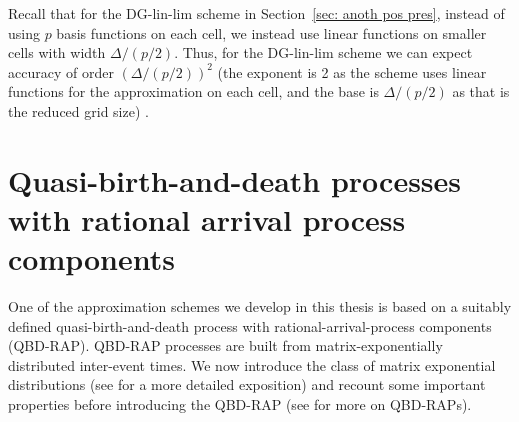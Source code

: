 Recall that for the DG-lin-lim scheme in Section~\ref{sec: anoth pos pres}, instead of using \(p\) basis functions on each cell, we instead use linear functions on smaller cells with width \(\Delta/(p/2)\). Thus, for the DG-lin-lim scheme we can expect accuracy of order \((\Delta/(p/2))^2\) (the exponent is 2 as the scheme uses linear functions for the approximation on each cell, and the base is \(\Delta/(p/2)\) as that is the reduced grid size) \citep[Sections~5.5,~5.8]{nodalDGBook}.




\section{Quasi-birth-and-death processes with rational arrival process components}\label{qbd-rap intro}
One of the approximation schemes we develop in this thesis is based on a suitably defined quasi-birth-and-death process with rational-arrival-process components (QBD-RAP). QBD-RAP processes are built from matrix-exponentially distributed inter-event times. We now introduce the class of matrix exponential distributions (see \cite{MEinAP} for a more detailed exposition) and recount some important properties before introducing the QBD-RAP (see \cite{bn2010} for more on QBD-RAPs). 

